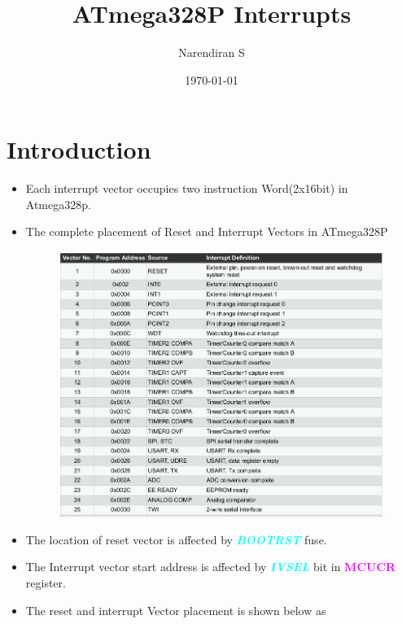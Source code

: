 \documentclass{article}
\title{ATmega328P Interrupts}
\author{Narendiran S}
\date{\today}
\newcommand{\bitFormat}[1]{\emph{\textbf{\textcolor{cyan}{#1}}}}
\newcommand{\regFormat}[1]{\textbf{\textcolor{magenta}{#1}}}
\begin{document}
\maketitle

\section{Introduction}
\begin{itemize}
    \item Each interrupt vector occupies two instruction Word(2x16bit) in Atmega328p.
    \item The complete placement of Reset and Interrupt Vectors in ATmega328P
    \begin{figure}[H]
        \begin{center}
            \includegraphics[height=.4\textheight]{resetAndInterruptVectors.png}
        \end{center}
    \end{figure}
    \item The location of reset vector is affected by \bitFormat{BOOTRST} fuse.
    \item The Interrupt vector start address is affected by \bitFormat{IVSEL} bit in \regFormat{MCUCR} register.
    \item The reset and interrupt Vector placement is shown below as
\end{itemize}
\end{document}
